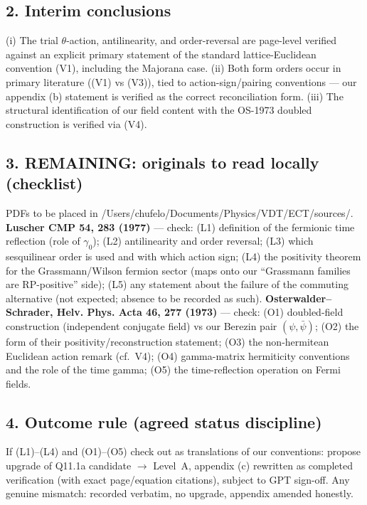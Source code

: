 \subsection*{2. Interim conclusions}
(i) The trial $\theta$-action, antilinearity, and order-reversal
are page-level verified against an explicit primary statement of
the standard lattice-Euclidean convention (V1), including the
Majorana case.
(ii) Both form orders occur in primary literature ((V1) vs (V3)),
tied to action-sign/pairing conventions --- our appendix (b)
statement is verified as the correct reconciliation form.
(iii) The structural identification of our field content with the
OS-1973 doubled construction is verified via (V4).

\subsection*{3. REMAINING: originals to read locally (checklist)}
PDFs to be placed in /Users/chufelo/Documents/Physics/VDT/ECT/sources/.
\textbf{Luscher CMP 54, 283 (1977)} --- check:
(L1) definition of the fermionic time reflection (role of
$\gamma_0$);
(L2) antilinearity and order reversal;
(L3) which sesquilinear order is used and with which action sign;
(L4) the positivity theorem for the Grassmann/Wilson fermion
sector (maps onto our ``Grassmann families are RP-positive'' side);
(L5) any statement about the failure of the commuting alternative
(not expected; absence to be recorded as such).
\textbf{Osterwalder--Schrader, Helv. Phys. Acta 46, 277 (1973)} ---
check:
(O1) doubled-field construction (independent conjugate field) vs
our Berezin pair $(\psi,\bar\psi)$;
(O2) the form of their positivity/reconstruction statement;
(O3) the non-hermitean Euclidean action remark (cf.\ V4);
(O4) gamma-matrix hermiticity conventions and the role of the time
gamma;
(O5) the time-reflection operation on Fermi fields.

\subsection*{4. Outcome rule (agreed status discipline)}
If (L1)--(L4) and (O1)--(O5) check out as translations of our
conventions: propose upgrade of Q11.1a candidate $\to$ Level~A,
appendix (c) rewritten as completed verification (with exact
page/equation citations), subject to GPT sign-off.
Any genuine mismatch: recorded verbatim, no upgrade, appendix
amended honestly.
